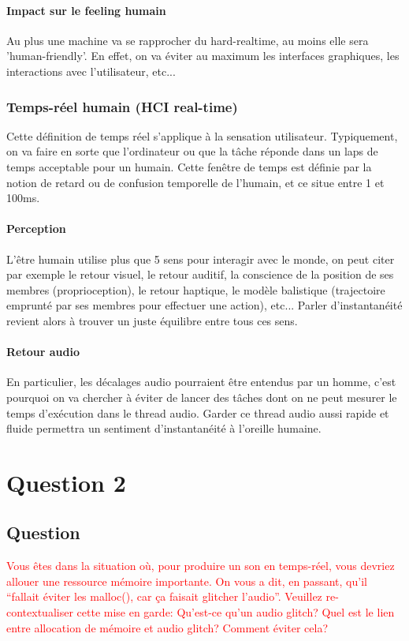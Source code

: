 \documentclass[letterpaper, 12pt]{article}
\newcommand{\alinea}{
\hspace*{0.5cm}}
\newcommand{\red}[1]{
	\textcolor{red}{#1}}
\begin{document}
				\paragraph{Impact sur le feeling humain} Au plus une machine va se rapprocher du hard-realtime, au moins elle
					sera 'human-friendly'. En effet, on va éviter au maximum les interfaces graphiques, les interactions avec
					l'utilisateur, etc...
			\subsubsection*{Temps-réel humain (HCI real-time)}
				\alinea Cette définition de temps réel s'applique à la sensation utilisateur. Typiquement, on va faire en sorte
					que l'ordinateur ou que la tâche réponde dans un laps de temps acceptable pour un humain. Cette fenêtre de 
					temps est définie par la notion de retard ou de confusion temporelle de l'humain, et ce situe entre 1 et 100ms. 
				\paragraph{Perception} L'être humain utilise plus que 5 sens pour interagir avec le monde, on peut citer par
					exemple le retour visuel, le retour auditif, la conscience de la position de ses membres (proprioception),
					le retour haptique, le modèle balistique (trajectoire emprunté par ses membres pour effectuer une action), etc...
					Parler d'instantanéité revient alors à trouver un juste équilibre entre tous ces sens.
				\paragraph{Retour audio} En particulier, les décalages audio pourraient être entendus par un homme, c'est pourquoi
					on va chercher à éviter de lancer des tâches dont on ne peut mesurer le temps d'exécution dans le thread audio.
					Garder ce thread audio aussi rapide et fluide permettra un sentiment d'instantanéité à l'oreille humaine.
	\section{Question 2}
		\subsection{Question}
			\alinea  \red{Vous êtes dans la situation où, pour produire un son en temps-réel, vous devriez allouer une ressource mémoire
				importante. On vous a dit, en passant, qu’il “fallait éviter les malloc(), car ça faisait glitcher l’audio”. 
				Veuillez re-contextualiser cette mise en garde: Qu’est-ce qu’un audio glitch? Quel est le lien entre allocation de 
				mémoire et audio glitch? Comment éviter cela?}
\end{document}
